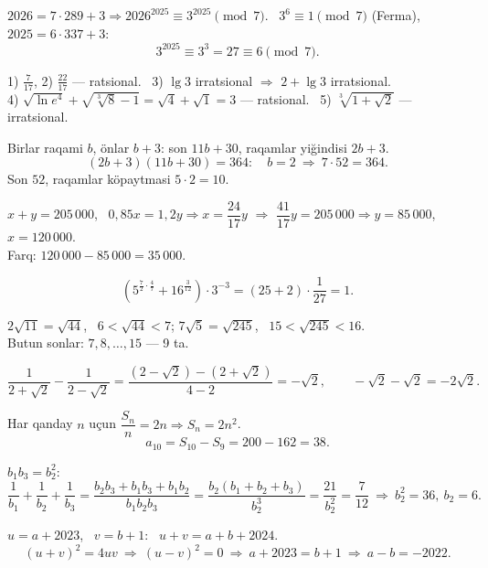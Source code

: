 




$2026=7\cdot289+3\Rightarrow 2026^{2025}\equiv3^{2025}\pmod7$. \ $3^6\equiv1\pmod7$ (Ferma), \ $2025=6\cdot337+3$:
\[3^{2025}\equiv3^3=27\equiv6\pmod7.\]

1) $\frac7{17}$, 2) $\frac{22}{17}$ — ratsional. \ 3) $\lg3$ irratsional $\Rightarrow$ $2+\lg3$ irratsional.\\
4) $\sqrt{\ln e^4}+\sqrt{\sqrt[3]8-1}=\sqrt4+\sqrt1=3$ — ratsional. \ 5) $\sqrt[3]{1+\sqrt2}$ — irratsional.

Birlar raqami $b$, önlar $b+3$: son $11b+30$, raqamlar yiğindisi $2b+3$.
\[(2b+3)(11b+30)=364:\quad b=2\ \Rightarrow\ 7\cdot52=364.\]
Son $52$, raqamlar köpaytmasi $5\cdot2=10$.

$x+y=205\,000$, \ $0{,}85x=1{,}2y\Rightarrow x=\dfrac{24}{17}y$ $\Rightarrow$ $\dfrac{41}{17}y=205\,000\Rightarrow y=85\,000$, \ $x=120\,000$.\\
Farq: $120\,000-85\,000=35\,000$.

\[\left(5^{\frac72\cdot\frac47}+16^{\frac3{12}}\right)\cdot3^{-3}=(25+2)\cdot\frac1{27}=1.\]

$2\sqrt{11}=\sqrt{44}$, \ $6<\sqrt{44}<7$; \quad $7\sqrt5=\sqrt{245}$, \ $15<\sqrt{245}<16$.\\
Butun sonlar: $7,8,\dots,15$ — 9 ta.

\[\frac1{2+\sqrt2}-\frac1{2-\sqrt2}=\frac{(2-\sqrt2)-(2+\sqrt2)}{4-2}=-\sqrt2,\qquad -\sqrt2-\sqrt2=-2\sqrt2.\]

Har qanday $n$ uçun $\dfrac{S_n}n=2n\Rightarrow S_n=2n^2$.
\[a_{10}=S_{10}-S_9=200-162=38.\]

$b_1b_3=b_2^2$:
\[\frac1{b_1}+\frac1{b_2}+\frac1{b_3}=\frac{b_2b_3+b_1b_3+b_1b_2}{b_1b_2b_3}=\frac{b_2(b_1+b_2+b_3)}{b_2^3}=\frac{21}{b_2^2}=\frac7{12}\ \Rightarrow\ b_2^2=36,\ b_2=6.\]

$u=a+2023$, \ $v=b+1$: \ $u+v=a+b+2024$.
\[(u+v)^2=4uv\ \Rightarrow\ (u-v)^2=0\ \Rightarrow\ a+2023=b+1\ \Rightarrow\ a-b=-2022.\]

